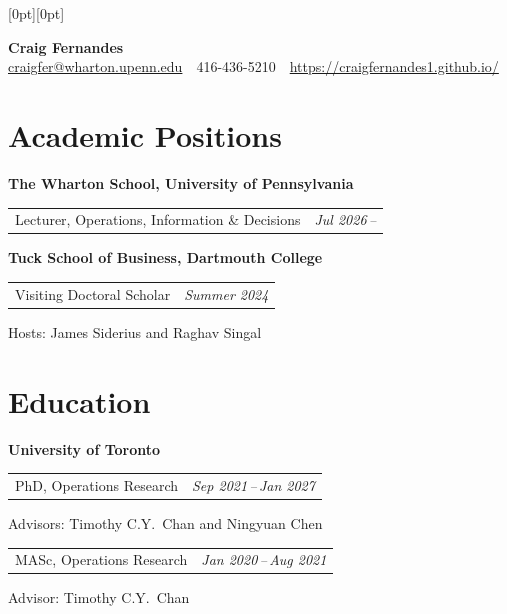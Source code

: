 \documentclass[11pt]{article}
\makeatletter
\newcommand{\cvrow}[2]{%
  \noindent\begin{tabularx}{\textwidth}{@{}X r@{}}
    #1 & \textit{#2}%
  \end{tabularx}\par
}
\makeatother
\begin{document}
\noindent\raisebox{2em}[0pt][0pt]{\makebox[\textwidth][r]{{\small\textcolor{agray!50}{Revised: November 2026}}}}%
\begin{center}
  {\LARGE\textbf{Craig Fernandes}}\\[5pt]
  \textcolor{ptblue}{\href{mailto:craigfer@wharton.upenn.edu}{craigfer@wharton.upenn.edu}}
  \,\textbar\,
  416-436-5210
  \,\textbar\,
  \textcolor{ptblue}{\href{https://craigfernandes1.github.io/}{https://craigfernandes1.github.io/}}
\end{center}


\section{Academic Positions}

\textbf{The Wharton School, University of Pennsylvania} \\
\cvrow{Lecturer, Operations, Information \& Decisions}{Jul 2026\,--}

\vspace{6pt}

\textbf{Tuck School of Business, Dartmouth College} \\
\cvrow{Visiting Doctoral Scholar}{Summer 2024}
Hosts: James Siderius and Raghav Singal

\section{Education}

\noindent\textbf{University of Toronto}

\vspace{2pt}

\cvrow{PhD, Operations Research}{Sep 2021\,--\,Jan 2027}
Advisors: Timothy C.Y.\ Chan and Ningyuan Chen

\vspace{4pt}

\cvrow{MASc, Operations Research}{Jan 2020\,--\,Aug 2021}
Advisor: Timothy C.Y.\ Chan

\vspace{4pt}
\end{document}
